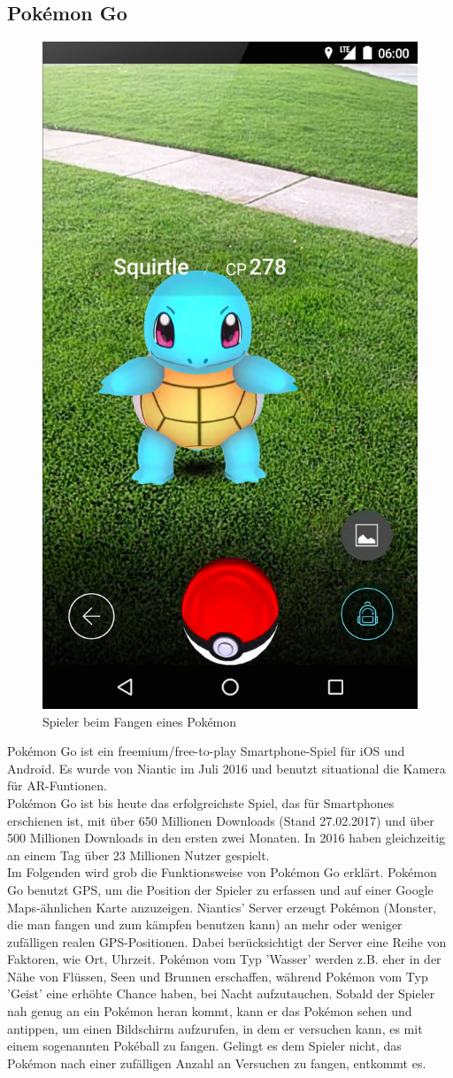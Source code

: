 \documentclass[extern,palatino]{cgBA}
\begin{document}
\subsection{Pokémon Go}
\begin{figure}[H]
	\centering
	\includegraphics[width=.5\textwidth]{pgcam.jpg}
	\caption{Spieler beim Fangen eines Pokémon}
\end{figure}
Pokémon Go ist ein freemium/free-to-play Smartphone-Spiel für iOS und Android. Es wurde von Niantic im Juli 2016 und benutzt situational die Kamera für AR-Funtionen\cite{pokewiki}.
	\\Pokémon Go ist bis heute das erfolgreichste Spiel, das für Smartphones erschienen ist, mit über 650 Millionen Downloads (Stand 27.02.2017)\cite{popol} und über 500 Millionen Downloads\cite{pobuis} in den ersten zwei  Monaten.
	In 2016 haben gleichzeitig an einem Tag über 23 Millionen Nutzer\cite{poapp} gespielt.
	\\
	Im Folgenden wird grob die Funktionsweise von Pokémon Go erklärt. Pokémon Go benutzt GPS, um die Position der Spieler zu erfassen und auf einer Google Maps-ähnlichen Karte anzuzeigen.
	Niantics' Server erzeugt Pokémon (Monster, die man fangen und zum kämpfen benutzen kann) an mehr oder weniger zufälligen realen GPS-Positionen. Dabei berücksichtigt der Server eine Reihe von Faktoren, wie Ort, Uhrzeit. Pokémon vom Typ 'Wasser' werden z.B. eher in der Nähe von Flüssen, Seen und Brunnen erschaffen, während Pokémon vom Typ 'Geist' eine erhöhte Chance haben, bei Nacht aufzutauchen. Sobald der Spieler nah genug an ein Pokémon heran kommt, kann er das Pokémon sehen und antippen, um einen Bildschirm aufzurufen, in dem er versuchen kann, es mit einem sogenannten Pokéball zu fangen. Gelingt es dem Spieler nicht, das Pokémon nach einer zufälligen Anzahl an Versuchen zu fangen, entkommt es.
\end{document}
